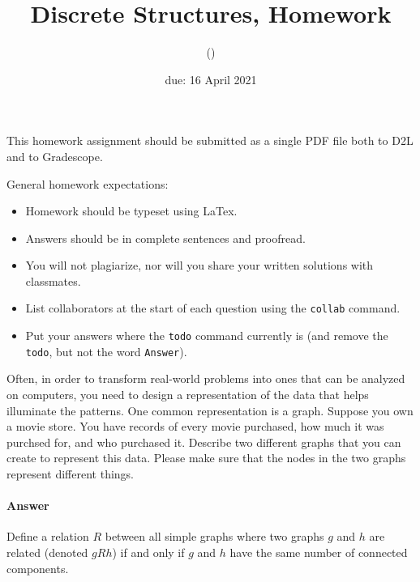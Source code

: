 \documentclass{article}
\title{Discrete Structures, Homework \hwnum}
\author{\todo{Your Name Here} (\todo{your discord handle here})}
\date{due: 16 April 2021}
\begin{document}
\maketitle

This homework assignment should be
submitted as a single PDF file both to D2L and to Gradescope.

General homework expectations:
\begin{itemize}
    \item Homework should be typeset using LaTex.
    \item Answers should be in complete sentences and proofread.
    \item You will not plagiarize, nor will you share your written solutions
        with classmates.
    \item List collaborators at the start of each question using the \texttt{collab} command.
    \item Put your answers where the \texttt{todo} command currently is (and
        remove the \texttt{todo}, but not the word \texttt{Answer}).
\end{itemize}


\collab{\todo{}} 

Often, in order to transform real-world problems into ones that can be analyzed
on computers, you need to design a representation of the data that helps
illuminate the patterns.  One common representation is a graph.  Suppose you own
a movie store.  You have records of every movie purchased, how much it was
purchsed for, and who purchased it.  Describe two different graphs that you can
create to represent this data.  Please make sure that the nodes in the two
graphs represent different things.

\paragraph{Answer}



\collab{\todo{}} 

Define a relation $R$ between all simple graphs where two graphs $g$ and $h$ are
related (denoted $gRh$) if and only if $g$ and $h$ have the same number of
connected components.
\end{document}
